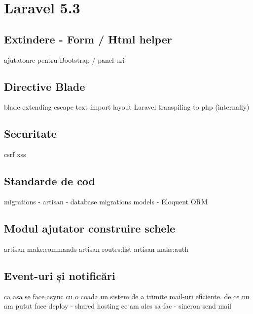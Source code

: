 \section{Laravel 5.3}
	\subsection{Extindere - Form / Html helper}
		ajutatoare pentru Bootstrap / panel-uri
	\subsection{Directive Blade}
		blade extending
		escape text
		import
		layout
		Laravel transpiling to php (internally)
	\subsection{Securitate}
		csrf
		xss
	\subsection{Standarde de cod}
		migrations - artisan - database migrations
		models - Eloquent ORM
	\subsection{Modul ajutator construire schele}
		artisan make:commands
		artisan routes:list
		artisan make:auth
	\subsection{Event-uri și notificări}
		ca asa se face async cu o coada un sistem de a trimite mail-uri eficiente.
		de ce nu am putut face deploy - shared hosting
		ce am ales sa fac - sincron send mail
